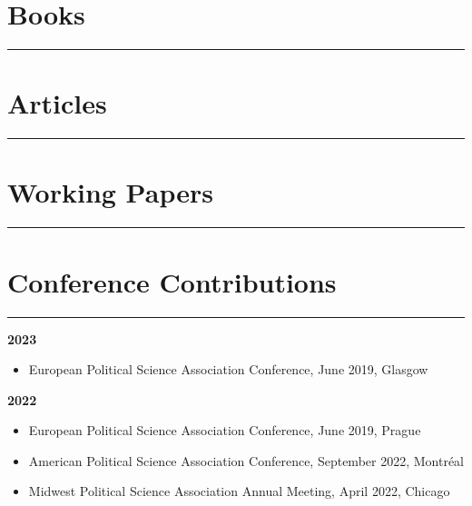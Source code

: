 \section*{Books}\vspace{-2em}\rule{\textwidth}{0.5pt}
\printbibliography[
	type=book,
	heading=none
]

\section*{Articles}\vspace{-2em}\rule{\textwidth}{0.5pt}
\printbibliography[
	type=article,
	heading=none
]

\section*{Working Papers}\vspace{-2em}\rule{\textwidth}{0.5pt}
\printbibliography[
	type=misc,
	heading=none
]

\section*{Conference Contributions}\vspace{-2em}\rule{\textwidth}{0.5pt}\vspace{1em}
\textbf{2023}
\begin{itemize}[topsep=0pt, noitemsep, leftmargin=3]
	\item European Political Science Association Conference, June 2019, Glasgow
\end{itemize}

\vspace{\baselineskip}

\textbf{2022}
\begin{itemize}[topsep=0pt, noitemsep, leftmargin=3]
	\item European Political Science Association Conference, June 2019, Prague
	\item American Political Science Association Conference, September 2022, Montréal
	\item Midwest Political Science Association Annual Meeting, April 2022, Chicago
\end{itemize}

\vspace{\baselineskip}

